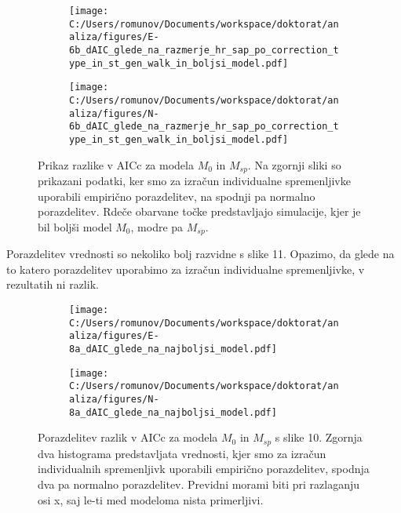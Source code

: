 \begin{figure}[H]
  \centering
  \begin{subfigure}[b]{1\textwidth}
    \centering
    \texttt{[image: C:/Users/romunov/Documents/workspace/doktorat/analiza/figures/E-6b\_dAIC\_glede\_na\_razmerje\_hr\_sap\_po\_correction\_type\_in\_st\_gen\_walk\_in\_boljsi\_model.pdf]}
    \label{sli:sub10.1}
  \end{subfigure}

  \begin{subfigure}[b]{1\textwidth}
    \centering
    \texttt{[image: C:/Users/romunov/Documents/workspace/doktorat/analiza/figures/N-6b\_dAIC\_glede\_na\_razmerje\_hr\_sap\_po\_correction\_type\_in\_st\_gen\_walk\_in\_boljsi\_model.pdf]}
    \label{sli:sub10.2}
  \end{subfigure}
  \caption[Prikaz razlike v AICc za modela $M_0$ in $M_{sp}$]{Prikaz razlike v AICc za modela $M_0$ in $M_{sp}$. Na zgornji sliki so prikazani podatki, ker smo za izračun individualne spremenljivke uporabili empirično porazdelitev, na spodnji pa normalno porazdelitev. Rdeče obarvane točke predstavljajo simulacije, kjer je bil boljši model $M_0$, modre pa $M_{sp}$.}
  \label{sli:slika10}
\end{figure}

Porazdelitev vrednosti so nekoliko bolj razvidne s slike 11. Opazimo, da glede na to katero porazdelitev uporabimo za izračun individualne spremenljivke, v rezultatih ni razlik.

\begin{figure}[H]
  \centering
  \begin{subfigure}[b]{1\textwidth}
    \centering
    \texttt{[image: C:/Users/romunov/Documents/workspace/doktorat/analiza/figures/E-8a\_dAIC\_glede\_na\_najboljsi\_model.pdf]}
    \label{sli:sub11.1}
  \end{subfigure}

  \begin{subfigure}[b]{1\textwidth}
    \centering
    \texttt{[image: C:/Users/romunov/Documents/workspace/doktorat/analiza/figures/N-8a\_dAIC\_glede\_na\_najboljsi\_model.pdf]}
    \label{sli:sub11.2}
  \end{subfigure}
  \caption[Prikaz razlike v AICc za modela $M_0$ in $M_{sp}$]{Porazdelitev razlik v AICc za modela $M_0$ in $M_{sp}$ s slike 10. Zgornja dva histograma predstavljata vrednosti, kjer smo za izračun individualnih spremenljivk uporabili empirično porazdelitev, spodnja dva pa normalno porazdelitev. Previdni morami biti  pri razlaganju osi x, saj le-ti med modeloma nista primerljivi.}
  \label{sli:slika11}
\end{figure}
